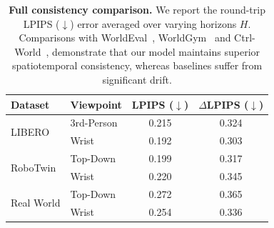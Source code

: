 \begin{table}[t]
    \centering
    
    \begin{minipage}[t]{0.5\textwidth}
        \vspace{0pt} %
        \centering
        \small
        \setlength{\tabcolsep}{3pt} %
        \caption{\textbf{Universal multi-view fidelity.} Quantitative evaluation across diverse platforms (LIBERO~\cite{liu2024libero}, RoboTwin~\cite{mu2025robotwin}, Real-Robot) and synchronized viewpoints. dWorldEval maintains consistent high fidelity (low $\Delta$LPIPS) on both simulation and real-world data.}
        \label{tab:uni_fidelity}
        \begin{sc}
            \begin{tabular}{ll|cc}
                \toprule
                Dataset & Viewpoint & LPIPS ($\downarrow$) & $\Delta$LPIPS ($\downarrow$) \\
                \midrule
                \multirow{2}{*}{LIBERO} & 3rd-Person & 0.215 & 0.324 \\
                                        & Wrist & 0.192 & 0.303 \\
                \midrule
                \multirow{2}{*}{RoboTwin} & Top-Down & 0.199 & 0.317 \\
                                          & Wrist & 0.220 & 0.345 \\
                \midrule
                \multirow{2}{*}{Real World} & Top-Down & 0.272 & 0.365 \\
                                            & Wrist & 0.254 & 0.336 \\
                \bottomrule
            \end{tabular}
        \end{sc}
    \end{minipage}%
    \hfill
    \begin{minipage}[t]{0.46\textwidth}
        \vspace{0pt} 
        \centering
        \small 
        \renewcommand{\arraystretch}{1} 
        \setlength{\tabcolsep}{6pt}
        \caption{\textbf{Full consistency comparison.} We report the round-trip LPIPS ($\downarrow$) error averaged over varying horizons $H$. Comparisons with WorldEval~\cite{li2025worldeval}, WorldGym~\cite{quevedo2506worldgym} and Ctrl-World~\cite{guo2025ctrl}, demonstrate that our model maintains superior spatiotemporal consistency, whereas baselines suffer from significant drift.}

\end{minipage}
\end{table}
